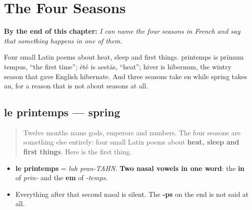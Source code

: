 
\chapter{The Four Seasons}
\label{ch:seasons}

\begin{chapteropening}
\textbf{By the end of this chapter:} \emph{I can name the four seasons in French and say that something happens in one of them.}

Four small Latin poems about heat, sleep and first things. printemps is prīmum tempus, \textquotedblleft{}the first time\textquotedblright{}; été is aestās, \textquotedblleft{}heat\textquotedblright{}; hiver is hībernum, the wintry season that gave English hibernate. And three seasons take en while spring takes au, for a reason that is not about seasons at all.
\end{chapteropening}

\section[le printemps]{le printemps — spring}

\label{lesson:FR-C09-printemps}



\begin{quote}
Twelve months name gods, emperors and numbers. The four seasons are something else entirely: four small Latin poems about \textbf{heat, sleep and first things}. Here is the first thing.
\end{quote}

\begin{sounds}
\begin{itemize}
\raggedright
  \item \textbf{le printemps} = \emph{luh pran-TAHN}. \textbf{Two nasal vowels in one word}: the \textbf{in} of \emph{prin-} and the \textbf{em} of \emph{-temps}.
  \item Everything after that second nasal is silent. The \textbf{-ps} on the end is not said at all.
\end{itemize}
\end{sounds}

